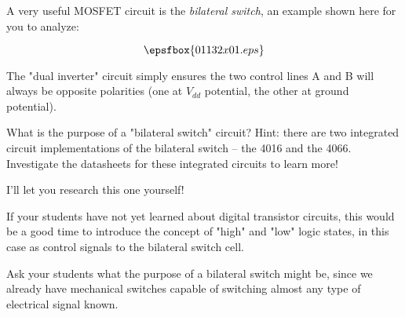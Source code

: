 

A very useful MOSFET circuit is the {\it bilateral switch}, an example shown here for you to analyze:

$$\epsfbox{01132x01.eps}$$

The "dual inverter" circuit simply ensures the two control lines A and B will always be opposite polarities (one at $V_{dd}$ potential, the other at ground potential).

What is the purpose of a "bilateral switch" circuit?  Hint: there are two integrated circuit implementations of the bilateral switch -- the 4016 and the 4066.  Investigate the datasheets for these integrated circuits to learn more!







I'll let you research this one yourself!







If your students have not yet learned about digital transistor circuits, this would be a good time to introduce the concept of "high" and "low" logic states, in this case as control signals to the bilateral switch cell.

Ask your students what the purpose of a bilateral switch might be, since we already have mechanical switches capable of switching almost any type of electrical signal known.




